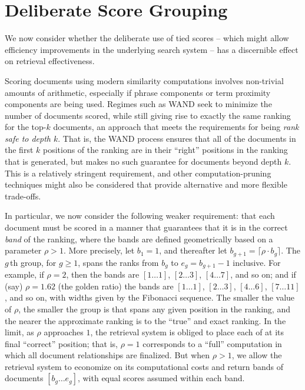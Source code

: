 \section{Deliberate Score Grouping}
\label{sec-roundingoff}

We now consider whether the deliberate use of tied scores -- which
might allow efficiency improvements in the underlying search system
-- has a discernible effect on retrieval effectiveness.


Scoring documents using modern similarity computations involves
non-trivial amounts of arithmetic, especially if phrase components or
term proximity components are being used.
Regimes such as WAND {\citep{bchsz03cikm}} seek to minimize the
number of documents scored, while still giving rise to exactly the
same ranking for the top-$k$ documents, an approach that meets the
requirements for being {\emph{rank safe to depth $k$}}.
That is, the WAND process ensures that all of the documents in the
first $k$ positions of the ranking are in their ``right'' positions
in the ranking that is generated, but makes no such guarantee for
documents beyond depth $k$.
This is a relatively stringent requirement, and other
computation-pruning techniques might also be considered that provide
alternative and more flexible trade-offs.

In particular, we now consider the following weaker requirement: that
each document must be scored in a manner that guarantees that it is
in the correct {\emph{band}} of the ranking, where the bands are
defined geometrically based on a parameter $\rho>1$.
More precisely, let $b_1=1$, and thereafter let
$b_{g+1}=\lceil{\rho\cdot b_g}\rceil$.
The $g$\,th group, for $g\ge1$, spans the ranks from $b_g$ to
$e_g=b_{g+1}-1$ inclusive.
For example, if $\rho=2$, then the bands are $[1\ldots1]$,
$[2\ldots3]$, $[4\ldots7]$, and so on; and if (say) $\rho=1.62$ (the
golden ratio) the bands are $[1\ldots1]$, $[2\ldots3]$, $[4\ldots6]$,
$[7\ldots11]$, and so on, with widths given by the Fibonacci
sequence.
The smaller the value of $\rho$, the smaller the group is that spans
any given position in the ranking, and the nearer the approximate
ranking is to the ``true'' and exact ranking.
In the limit, as $\rho$ approaches $1$, the retrieval system is
obliged to place each of at its final ``correct'' position; that is,
$\rho=1$ corresponds to a ``full'' computation in which all document
relationships are finalized.
But when $\rho>1$, we allow the retrieval system to economize on its
computational costs and return bands of documents $[b_g\ldots e_g]$,
with equal scores assumed within each band.

